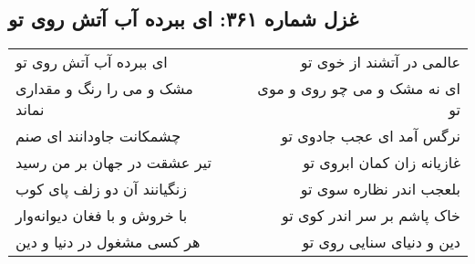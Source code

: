 \begin{center}
\section*{غزل شماره ۳۶۱: ای ببرده آب آتش روی تو}
\label{sec:361}
\begin{longtable}{l p{0.5cm} r}
ای ببرده آب آتش روی تو
&&
عالمی در آتشند از خوی تو
\\
مشک و می را رنگ و مقداری نماند
&&
ای نه مشک و می چو روی و موی تو
\\
چشمکانت جاودانند ای صنم
&&
نرگس آمد ای عجب جادوی تو
\\
تیر عشقت در جهان بر من رسید
&&
غازیانه زان کمان ابروی تو
\\
زنگیانند آن دو زلف پای کوب
&&
بلعجب اندر نظاره سوی تو
\\
با خروش و با فغان دیوانه‌وار
&&
خاک پاشم بر سر اندر کوی تو
\\
هر کسی مشغول در دنیا و دین
&&
دین و دنیای سنایی روی تو
\\
\end{longtable}
\end{center}
